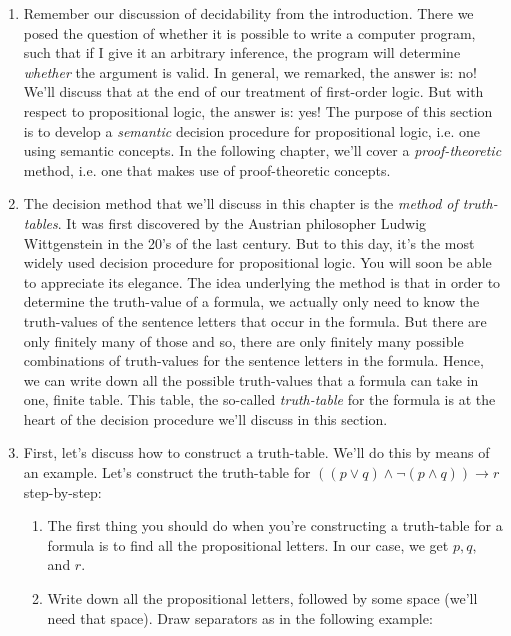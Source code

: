	\begin{enumerate}[\thesection.1]

		\item Remember our discussion of decidability from the introduction. There we posed the question of whether it is possible to write a computer program, such that if I give it an arbitrary inference, the program will determine \emph{whether} the argument is valid. In general, we remarked, the answer is: no! We'll discuss that at the end of our treatment of first-order logic. But with respect to propositional logic, the answer is: yes! The purpose of this section is to develop a \emph{semantic} decision procedure for propositional logic, i.e. one using semantic concepts. In the following chapter, we'll cover a \emph{proof-theoretic} method, i.e. one that makes use of proof-theoretic concepts.
		
		\item The decision method that we'll discuss in this chapter is the \emph{method of truth-tables}. It was first discovered by the Austrian philosopher Ludwig Wittgenstein in the 20's of the last century. But to this day, it's the most widely used decision procedure for propositional logic. You will soon be able to appreciate its elegance. The idea underlying the method is that in order to determine the truth-value of a formula, we actually only need to know the truth-values of the sentence letters that occur in the formula. But there are only finitely many of those and so, there are only finitely many possible combinations of truth-values for the sentence letters in the formula. Hence, we can write down all the possible truth-values that a formula can take in one, finite table. This table, the so-called \emph{truth-table} for the formula is at the heart of the decision procedure we'll discuss in this section.
	
	\item First, let's discuss how to construct a truth-table. We'll do this by means of an example. Let's construct the truth-table for $((p\lor q)\land \neg (p\land q)) \to r$  step-by-step:

\begin{enumerate}

\item The first thing you should do when you're constructing a truth-table for a formula is to find all the propositional letters. In our case, we get $p,q,$ and $r$.

\item Write down all the propositional letters, followed by some space (we'll need that space). Draw separators as in the following example:


\end{enumerate}
\end{enumerate}
